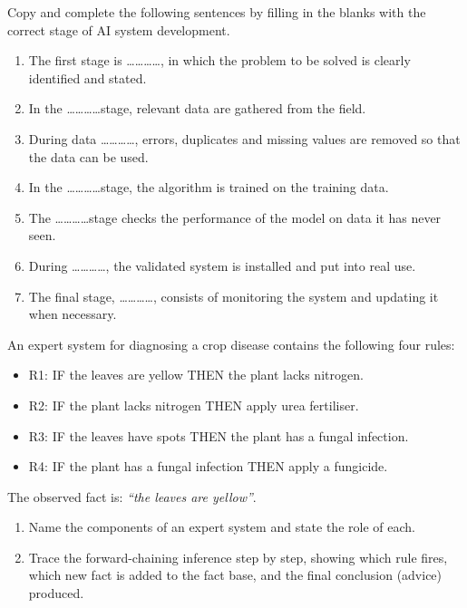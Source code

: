 \documentclass[11pt]{article}
\begin{document}
\begin{exercice}
Copy and complete the following sentences by filling in the blanks with the correct stage of AI system development.
\begin{enumerate}
\item The first stage is \ldots\ldots\ldots\ldots, in which the problem to be solved is clearly identified and stated.
\item In the \ldots\ldots\ldots\ldots stage, relevant data are gathered from the field.
\item During data \ldots\ldots\ldots\ldots, errors, duplicates and missing values are removed so that the data can be used.
\item In the \ldots\ldots\ldots\ldots stage, the algorithm is trained on the training data.
\item The \ldots\ldots\ldots\ldots stage checks the performance of the model on data it has never seen.
\item During \ldots\ldots\ldots\ldots, the validated system is installed and put into real use.
\item The final stage, \ldots\ldots\ldots\ldots, consists of monitoring the system and updating it when necessary.
\end{enumerate}
\end{exercice}

\begin{exercice}
An expert system for diagnosing a crop disease contains the following four rules:
\begin{itemize}
\item R1: IF the leaves are yellow THEN the plant lacks nitrogen.
\item R2: IF the plant lacks nitrogen THEN apply urea fertiliser.
\item R3: IF the leaves have spots THEN the plant has a fungal infection.
\item R4: IF the plant has a fungal infection THEN apply a fungicide.
\end{itemize}
The observed fact is: \emph{``the leaves are yellow''}.
\begin{enumerate}
\item Name the components of an expert system and state the role of each.
\item Trace the forward-chaining inference step by step, showing which rule fires, which new fact is added to the fact base, and the final conclusion (advice) produced.
\end{enumerate}
\end{exercice}
\end{document}

